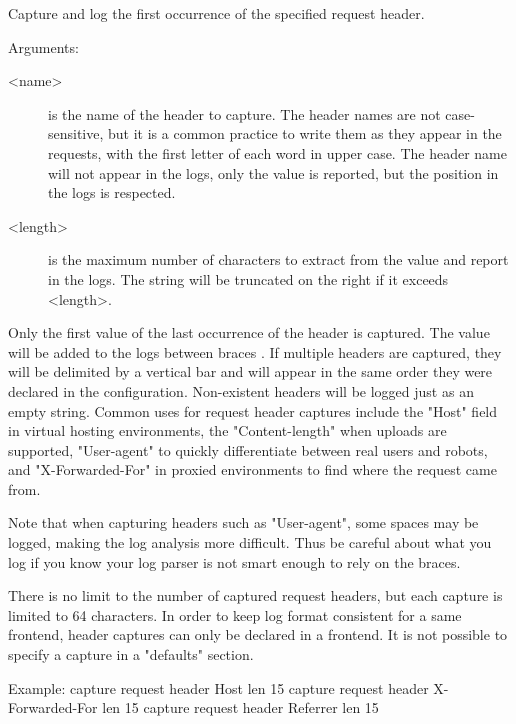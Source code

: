   Capture and log the first occurrence of the specified request header.

  
  Arguments:
  \begin{description}
  \item[<name>]    is the name of the header to capture. The header names are not
              case-sensitive, but it is a common practice to write them as they
              appear in the requests, with the first letter of each word in
              upper case. The header name will not appear in the logs, only the
              value is reported, but the position in the logs is respected.

  \item[<length>]  is the maximum number of characters to extract from the value and
              report in the logs. The string will be truncated on the right if
              it exceeds <length>.
  \end{description}

  Only the first value of the last occurrence of the header is captured. The
  value will be added to the logs between braces \chr{\{\}}. If multiple headers
  are captured, they will be delimited by a vertical bar \chr{|} and will appear
  in the same order they were declared in the configuration. Non-existent
  headers will be logged just as an empty string. Common uses for request
  header captures include the "Host" field in virtual hosting environments, the
  "Content-length" when uploads are supported, "User-agent" to quickly
  differentiate between real users and robots, and "X-Forwarded-For" in proxied
  environments to find where the request came from.

  Note that when capturing headers such as "User-agent", some spaces may be
  logged, making the log analysis more difficult. Thus be careful about what
  you log if you know your log parser is not smart enough to rely on the
  braces.

  There is no limit to the number of captured request headers, but each capture
  is limited to 64 characters. In order to keep log format consistent for a
  same frontend, header captures can only be declared in a frontend. It is not
  possible to specify a capture in a "defaults" section.

  \begin{example}{Example:}
        capture request header Host len 15
        capture request header X-Forwarded-For len 15
        capture request header Referrer len 15
  \end{example}


